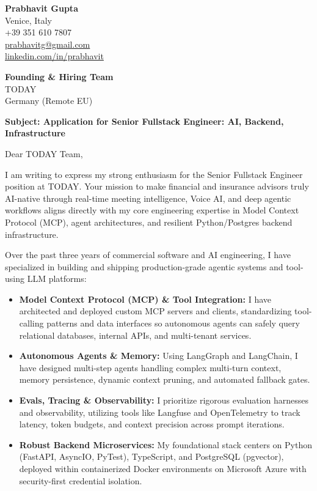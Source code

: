 \documentclass[11pt,a4paper]{letter}
\begin{document}
\begin{flushleft}
\textbf{Prabhavit Gupta}\\
Venice, Italy\\
+39 351 610 7807\\
\href{mailto:prabhavitg@gmail.com}{prabhavitg@gmail.com}\\
\href{https://www.linkedin.com/in/prabhavit/}{linkedin.com/in/prabhavit}
\end{flushleft}

\vspace{1em}

\begin{flushleft}
\textbf{Founding \& Hiring Team}\\
TODAY\\
Germany (Remote EU)
\end{flushleft}

\vspace{0.5em}

\textbf{Subject: Application for Senior Fullstack Engineer: AI, Backend, Infrastructure}

\vspace{0.5em}

Dear TODAY Team,

I am writing to express my strong enthusiasm for the Senior Fullstack Engineer position at TODAY. Your mission to make financial and insurance advisors truly AI-native through real-time meeting intelligence, Voice AI, and deep agentic workflows aligns directly with my core engineering expertise in Model Context Protocol (MCP), agent architectures, and resilient Python/Postgres backend infrastructure.

Over the past three years of commercial software and AI engineering, I have specialized in building and shipping production-grade agentic systems and tool-using LLM platforms:

\begin{itemize}
  \item \textbf{Model Context Protocol (MCP) \& Tool Integration:} I have architected and deployed custom MCP servers and clients, standardizing tool-calling patterns and data interfaces so autonomous agents can safely query relational databases, internal APIs, and multi-tenant services.
  \item \textbf{Autonomous Agents \& Memory:} Using LangGraph and LangChain, I have designed multi-step agents handling complex multi-turn context, memory persistence, dynamic context pruning, and automated fallback gates.
  \item \textbf{Evals, Tracing \& Observability:} I prioritize rigorous evaluation harnesses and observability, utilizing tools like Langfuse and OpenTelemetry to track latency, token budgets, and context precision across prompt iterations.
  \item \textbf{Robust Backend Microservices:} My foundational stack centers on Python (FastAPI, AsyncIO, PyTest), TypeScript, and PostgreSQL (pgvector), deployed within containerized Docker environments on Microsoft Azure with security-first credential isolation.
\end{itemize}
\end{document}

